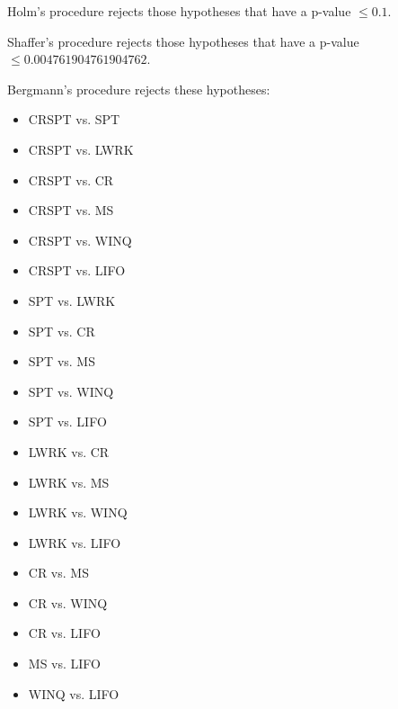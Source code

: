 \documentclass[a3paper,10pt]{article}
\begin{document}
Holm's procedure rejects those hypotheses that have a p-value $\le0.1$.


Shaffer's procedure rejects those hypotheses that have a p-value $\le0.004761904761904762$.


Bergmann's procedure rejects these hypotheses:


\begin{itemize}


\item CRSPT vs. SPT
\item CRSPT vs. LWRK
\item CRSPT vs. CR
\item CRSPT vs. MS
\item CRSPT vs. WINQ
\item CRSPT vs. LIFO
\item SPT vs. LWRK
\item SPT vs. CR
\item SPT vs. MS
\item SPT vs. WINQ
\item SPT vs. LIFO
\item LWRK vs. CR
\item LWRK vs. MS
\item LWRK vs. WINQ
\item LWRK vs. LIFO
\item CR vs. MS
\item CR vs. WINQ
\item CR vs. LIFO
\item MS vs. LIFO
\item WINQ vs. LIFO
\end{itemize}
\end{document}

